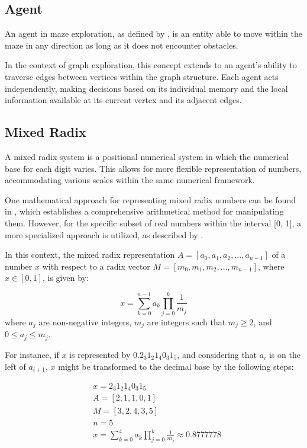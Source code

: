 \subsection{Agent}
\label{section_definitions_agent}

An agent in maze exploration, as defined by , 
is an entity able to move within the maze in any direction as long as it does not encounter obstacles.

In the context of graph exploration, this concept extends to an agent's ability to traverse
edges between vertices within the graph structure. Each agent acts independently,
making decisions based on its individual memory and the local information available at its current vertex and its adjacent edges.


\subsection{Mixed Radix}
\label{section_definitions_mixed_radix}

A mixed radix system is a positional numerical system in which the numerical base for each digit
varies. This allows for more flexible representation of numbers,
accommodating various scales within the same numerical framework.

One mathematical approach for representing mixed radix numbers can be found in ,
which establishes a comprehensive arithmetical method for manipulating them.  However,
for the specific subset of real numbers within the interval [0, 1], a more specialized approach is utilized, as described by .

In this context, the mixed radix representation $A=[a_{0},a_{1},a_{2},...,a_{n-1}]$ 
of a number $x$ with respect to a radix vector $M=[m_{0},m_{1},m_{2},...,m_{n-1}]$,
where $x \in [0,1]$, is given by:

\begin{equation}
	x = \sum_{k=0}^{n-1} a_{k} \prod_{j=0}^{k} \frac{1}{m_j}
\end{equation}
where $a_j$ are non-negative integers, $m_j$ are integers such that $m_j \geq 2$, and $0 \leq a_j \leq m_j$. \cite{Arthur2023}


For instance, if $x$ is represented by $0.2_{3}1_{2}1_{4}0_{3}1_{5}$, and considering that $a_{i}$ is on the left of $a_{i+1}$, $x$ might be transformed to the decimal base by the following steps:

\begin{align}
& x=2_{3}1_{2}1_{4}0_{3}1_{5}\\
& A=[2,1,1,0,1]\\
& M=[3,2,4,3,5]\\
& n=5\\
& x = \sum_{k=0}^{4} a_{k} \prod_{j=0}^{k} \frac{1}{m_j} \approx 0.8777778
\end{align}

